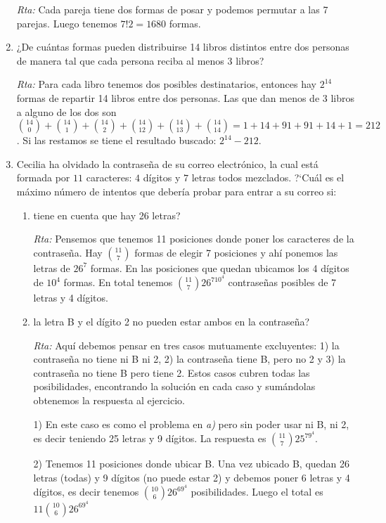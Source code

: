 \documentclass[a4paper,12pt,twoside,spanish,reqno]{amsbook}
\numberwithin{equation}{section}
\begin{document}
\begin{enumerate}
\noindent\textit{Rta:} Cada pareja tiene dos formas de posar y podemos permutar a las 7 parejas. Luego tenemos $7!2=1680$ formas.

\medskip

\item ¿De cuántas formas pueden distribuirse 14 libros distintos entre dos personas de
manera tal que cada persona reciba al menos 3 libros?

\noindent\textit{Rta:} Para cada libro tenemos dos posibles destinatarios, entonces hay $2^{14}$ formas de repartir 14 libros entre dos personas.  Las que dan menos de 3 libros a alguno de los dos son $\binom{14}{0}+\binom{14}{1}+\binom{14}{2}+\binom{14}{12}+\binom{14}{13}+\binom{14}{14}=1+14+91+91+14+1=212$. Si las restamos se tiene el resultado buscado: $2^{14}-212$.



\item
Cecilia ha olvidado la contraseña de su correo electrónico, la cual est\'a formada por $11$ caracteres: $4$ d\'igitos y $7$ letras todos mezclados. ?`Cu\'al es el m\'aximo n\'umero de intentos que deber\'ia probar para entrar a su correo si:
\begin{enumerate}
    \item  tiene en cuenta que hay 26 letras?
    
    \textit{Rta:} Pensemos que tenemos 11 posiciones donde poner los caracteres de la contraseña. Hay $\binom{11}{7}$ formas de elegir 7 posiciones y ahí ponemos las letras de $26^7$ formas. En  las  posiciones que quedan ubicamos los 4 dígitos de $10^4$ formas. En total tenemos $\binom{11}{7}26^710^4$   contraseñas posibles de 7 letras y 4 dígitos.
    
    \item la letra B y el d\'igito 2 no pueden estar ambos en la contraseña?
    
    \textit{Rta:} Aquí debemos pensar en  tres casos mutuamente excluyentes: 1) la contraseña no tiene ni B ni 2, 2) la contraseña tiene B, pero no 2 y 3) la contraseña no tiene B pero tiene 2. Estos casos cubren todas las posibilidades,  encontrando  la solución en cada caso y sumándolas obtenemos la respuesta al ejercicio.
    
    1) En  este caso es como  el problema en \textit{a)} pero sin poder usar ni B, ni 2,  es decir teniendo 25 letras y 9 dígitos. La respuesta es $\binom{11}{7}25^79^4$.
    
    2) Tenemos 11 posiciones donde ubicar B. Una vez ubicado  B,  quedan 26 letras (todas) y 9 dígitos (no puede estar 2) y debemos poner 6 letras y 4 dígitos,  es decir tenemos $\binom{10}{6}26^69^4$ posibilidades. Luego el total es $11\binom{10}{6}26^69^4$
    

\end{enumerate}
\end{enumerate}
\end{document}
